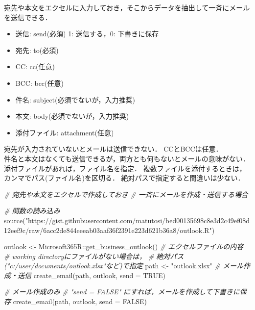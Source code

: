 \documentclass[
]{article}
\newenvironment{Shaded}{\begin{snugshade}}{\end{snugshade}}
\newcommand{\AttributeTok}[1]{\textcolor[rgb]{0.77,0.63,0.00}{#1}}
\newcommand{\CommentTok}[1]{\textcolor[rgb]{0.56,0.35,0.01}{\textit{#1}}}
\newcommand{\ConstantTok}[1]{\textcolor[rgb]{0.00,0.00,0.00}{#1}}
\newcommand{\FunctionTok}[1]{\textcolor[rgb]{0.00,0.00,0.00}{#1}}
\newcommand{\NormalTok}[1]{#1}
\newcommand{\OtherTok}[1]{\textcolor[rgb]{0.56,0.35,0.01}{#1}}
\newcommand{\SpecialCharTok}[1]{\textcolor[rgb]{0.00,0.00,0.00}{#1}}
\newcommand{\StringTok}[1]{\textcolor[rgb]{0.31,0.60,0.02}{#1}}
\providecommand{\tightlist}{%
  \setlength{\itemsep}{0pt}\setlength{\parskip}{0pt}}
\begin{document}
宛先や本文をエクセルに入力しておき，そこからデータを抽出して一斉にメールを送信できる．

\begin{itemize}
\tightlist
\item
  送信: send(必須) 1: 送信する，0: 下書きに保存
\item
  宛先: to(必須)\\
\item
  CC: cc(任意)\\
\item
  BCC: bcc(任意)\\
\item
  件名: subject(必須でないが，入力推奨)\\
\item
  本文: body(必須でないが，入力推奨)\\
\item
  添付ファイル: attachment(任意)
\end{itemize}

宛先が入力されていないとメールは送信できない．
CCとBCCは任意．\\
件名と本文はなくても送信できるが，両方とも何もないとメールの意味がない．\\
添付ファイルがあれば，ファイル名を指定．
複数ファイルを添付するときは，カンマでパス(ファイル名)を区切る．
絶対パスで指定すると間違いは少ない．

\begin{Shaded}
\begin{Highlighting}[]
  \CommentTok{\# 宛先や本文をエクセルで作成しておき}
  \CommentTok{\#   一斉にメールを作成・送信する場合}

  \CommentTok{\# 関数の読み込み}
\FunctionTok{source}\NormalTok{(}\StringTok{"https://gist.githubusercontent.com/matutosi/bed00135698c8e3d2c49ef08d12eef9c/raw/6acc2de844eeeab03aaf36f2391e223d621b36a8/outlook.R"}\NormalTok{)}

\NormalTok{outlook }\OtherTok{\textless{}{-}}\NormalTok{ Microsoft365R}\SpecialCharTok{::}\FunctionTok{get\_business\_outlook}\NormalTok{()}
  \CommentTok{\# エクセルファイルの内容}
  \CommentTok{\#   working directoryにファイルがない場合は，}
  \CommentTok{\#   絶対パス("c:/user/documents/outlook.xlsx"など)で指定}
\NormalTok{path }\OtherTok{\textless{}{-}} \StringTok{"outlook.xlsx"}
  \CommentTok{\# メール作成・送信}
\FunctionTok{create\_email}\NormalTok{(path, outlook, }\AttributeTok{send =} \ConstantTok{TRUE}\NormalTok{)}

  \CommentTok{\# メール作成のみ}
  \CommentTok{\#   "send = FALSE" にすれば，メールを作成して下書きに保存}
\FunctionTok{create\_email}\NormalTok{(path, outlook, }\AttributeTok{send =} \ConstantTok{FALSE}\NormalTok{)}
\end{Highlighting}
\end{Shaded}
\end{document}

